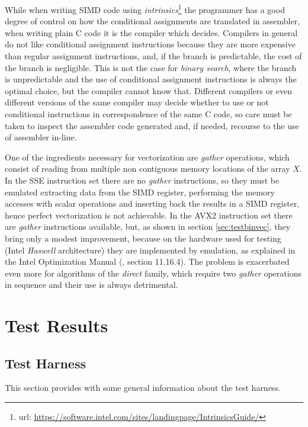 \documentclass[preprint,1p,times]{elsarticle}
\begin{document}
While when writing SIMD code using \textit{intrinsics}\footnote{url: \url{https://software.intel.com/sites/landingpage/IntrinsicsGuide/}} the programmer has a good degree of control on how the conditional assignments are translated in assembler, when writing plain C code it is the compiler which decides. Compilers in general do not like conditional assignment instructions because they are more expensive than regular assignment instructions, and, if the branch is predictable, the cost of the branch is negligible. This is not the case for \textit{binary search}, where the branch is unpredictable and the use of conditional assignment instructions is always the optimal choice, but the compiler cannot know that. Different compilers or even different versions of the same compiler may decide whether to use or not conditional instructions in correspondence of the same C code, so care must be taken to inspect the assembler code generated and, if needed, recourse to the use of assembler in-line.

One of the ingredients necessary for vectorization are \textit{gather} operations, which consist of reading from multiple non contiguous memory locations of the array $X$.
In the SSE instruction set there are no \textit{gather} instructions, so they must be emulated extracting data from the SIMD register, performing the memory accesses with scalar operations and inserting back the results in a SIMD register, hence perfect vectorization is not achievable.
In the AVX2 instruction set there are \textit{gather} instructions available, but, as shown in section \ref{sec:testbinvec}, they bring only a modest improvement, because on the hardware used for testing (Intel \textit{Haswell} architecture) they are implemented by emulation, as explained in the Intel Optimization Manual (\cite{Intel2016}, section 11.16.4). The problem is exacerbated even more for algorithms of the \textit{direct} family, which require two \textit{gather} operations in sequence and their use is always detrimental.

\section{Test Results}
\label{sec:results}


\subsection{Test Harness}
This section provides with some general information about the test harness.
\end{document}
